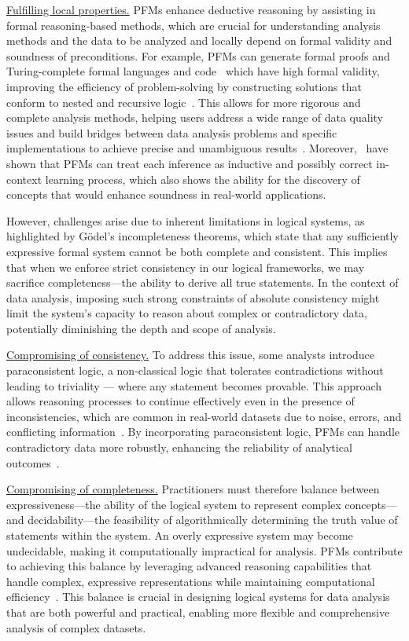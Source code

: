 \underline{Fulfilling local properties.} PFMs enhance deductive reasoning by assisting in formal reasoning-based methods, which are crucial for understanding analysis methods and the data to be analyzed and locally depend on formal validity and soundness of preconditions. For example, PFMs can generate formal proofs and Turing-complete formal languages and code~\cite{Li2024IsPB} which have high formal validity, improving the efficiency of problem-solving by constructing solutions that conform to nested and recursive logic~\cite{Khakhar2023PACPS}. This allows for more rigorous and complete analysis methods, helping users address a wide range of data quality issues and build bridges between data analysis problems and specific implementations to achieve precise and unambiguous results~\cite{qi2024cleanagent}. Moreover,~\cite {Li2024IsPB} have shown that PFMs can treat each inference as inductive and possibly correct in-context learning process, which also shows the ability for the discovery of concepts that would enhance soundness in real-world applications.

However, challenges arise due to inherent limitations in logical systems, as highlighted by Gödel's incompleteness theorems, which state that any sufficiently expressive formal system cannot be both complete and consistent. This implies that when we enforce strict consistency in our logical frameworks, we may sacrifice completeness—the ability to derive all true statements. In the context of data analysis, imposing such strong constraints of absolute consistency might limit the system's capacity to reason about complex or contradictory data, potentially diminishing the depth and scope of analysis.

\underline{Compromising of consistency.} To address this issue, some analysts introduce paraconsistent logic, a non-classical logic that tolerates contradictions without leading to triviality — where any statement becomes provable. This approach allows reasoning processes to continue effectively even in the presence of inconsistencies, which are common in real-world datasets due to noise, errors, and conflicting information~\cite{022batini2009methodologies}. By incorporating paraconsistent logic, PFMs can handle contradictory data more robustly, enhancing the reliability of analytical outcomes~\cite{037little2019statistical}.

\underline{Compromising of completeness.} Practitioners must therefore balance between expressiveness—the ability of the logical system to represent complex concepts—and decidability—the feasibility of algorithmically determining the truth value of statements within the system. An overly expressive system may become undecidable, making it computationally impractical for analysis. PFMs contribute to achieving this balance by leveraging advanced reasoning capabilities that handle complex, expressive representations while maintaining computational efficiency~\cite{Pei2023CanLL, Wang2024TheoremLlamaTG}. This balance is crucial in designing logical systems for data analysis that are both powerful and practical, enabling more flexible and comprehensive analysis of complex datasets.

